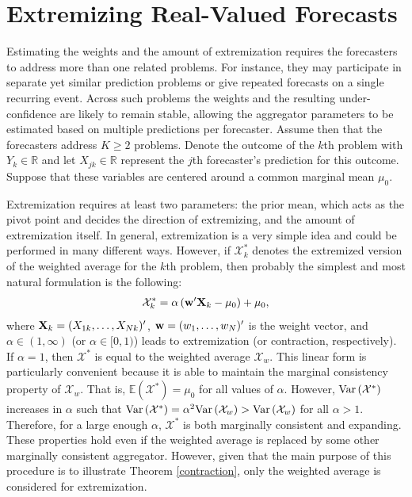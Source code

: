 \documentclass[11pt]{article}
\newcommand{\E}{\mathbb{E}}
\theoremstyle{definition}
\theoremstyle{definition}
\def\w{{\bf w}}
\def\X{{\bf X}}
\def\E{{\mathbb E}}
\def\Var{{\rm Var}\,}
\begin{document}
\section{Extremizing Real-Valued Forecasts} \label{extremization}

Estimating the weights and the amount of extremization requires the forecasters to address more than one related problems. For instance, they may participate in separate yet similar prediction problems or give repeated forecasts on a single recurring event. Across such problems the weights and the resulting under-confidence are likely to remain stable, allowing the aggregator parameters to be estimated based on multiple predictions per forecaster. Assume then  that the forecasters address $K \geq 2$ problems. Denote the outcome of the $k$th problem with $Y_k \in \mathbb{R}$ and let $X_{jk} \in \mathbb{R}$ represent the $j$th forecaster's prediction for this outcome. Suppose that these variables are centered around a common marginal mean $\mu_0$.  



Extremization requires at least two parameters: the prior mean, which acts as the pivot point and decides the direction of extremizing, and the amount of extremization itself.  In general, extremization is a very simple idea and could be performed in many different ways. However, if $\mathcal{X}_k^*$ denotes the extremized version of the weighted average for the $k$th problem, then probably the simplest and most natural formulation is the following:
\begin{align*}
\mathcal{X}_k^* = \alpha  \left(  \w'\X_{k} - \mu_0\right) + \mu_0,
\end{align*}
 where $\X_k = (X_{1k}, \dots, X_{Nk})'$, $\w = (w_1, \dots, w_N)'$ is the weight vector, and $\alpha \in (1, \infty)$ (or $\alpha \in [0, 1)$) leads to extremization (or contraction, respectively). If $\alpha = 1$, then $\mathcal{X}^*$ is equal to the weighted average $\mathcal{X}_w$.  This linear form is particularly convenient because it is able to maintain the marginal consistency property of $\mathcal{X}_w$. That is, $\E(\mathcal{X}^*) = \mu_0$ for all values of $\alpha$.  However, $\Var(\mathcal{X}^*)$ increases in $\alpha$ such that $\Var(\mathcal{X}^*) = \alpha^2 \Var(\mathcal{X}_w) > \Var(\mathcal{X}_w)$ for all $\alpha > 1$. Therefore, for a large enough $\alpha$, $\mathcal{X}^*$ is both marginally consistent and expanding. These properties hold even if the weighted average is replaced by some other marginally consistent aggregator. However, given that the main purpose of this procedure is to illustrate Theorem \ref{contraction}, only the weighted average is considered for extremization.
\end{document}
